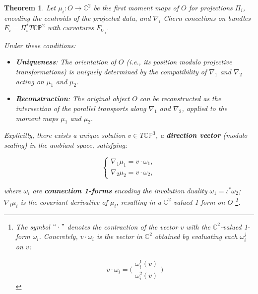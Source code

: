 \documentclass[10pt,a4paper]{amsart}
\newtheorem{thm}{Theorem}
\begin{document}
\begin{thm}\label{P:2}
Let \( \mu_i: O \to \mathbb{C}^2 \) be the first moment maps of \( O \) for projections \( \Pi_i \), encoding the centroids of the projected data, and $\nabla_i$ Chern conections on bundles $E_i=\Pi_i^*T\mathbb{CP}^2$ with curvatures $F_{\nabla_i}$.

\smallskip 

Under these conditions:

\begin{itemize}
\item  {\bf Uniqueness}: The orientation of \( O \) (i.e., its position modulo projective transformations) is uniquely determined by the compatibility of \( \nabla_1 \) and \( \nabla_2 \) acting on \( \mu_1 \) and \( \mu_2 \).

\item {\bf Reconstruction}: The original object \( O \) can be reconstructed as the intersection of the parallel transports along \( \nabla_1 \) and \( \nabla_2 \), applied to the moment maps \( \mu_1 \) and \( \mu_2 \).
\end{itemize}
Explicitly, there exists a unique solution \( v \in T\mathbb{CP}^3 \), a {\bf direction vector} (modulo scaling) in the ambiant space, satisfying:

\[
\begin{cases}
\nabla_1 \mu_1 = v \cdot \omega_1, \\
\nabla_2 \mu_2 = v \cdot \omega_2, 
\end{cases}
\]

where \( \omega_i \) are {\bf connection 1-forms} encoding the involution duality \( \omega_1 = \iota^* \omega_2 \);
 $\nabla_i \mu_i$ is the covariant derivative of $\mu_i$, resulting in a $\mathbb{C}^2$-valued 1-form on $O$ \footnote{ The symbol $``\cdot"$ denotes the contraction of the vector $v$ with the $\mathbb{C}^2$-valued  1-form $\omega_i$. Concretely, 
$v \cdot \omega_i$ is the vector in $\mathbb{C}^2$ obtained by evaluating each $\omega_i^j$ on $v$: 

\[ v \cdot \omega_i=\bigg(\begin{smallmatrix} \omega_i^1(v)\\ \omega_i^2(v)\end{smallmatrix}\bigg)\]}. 
\end{thm}
\end{document}
